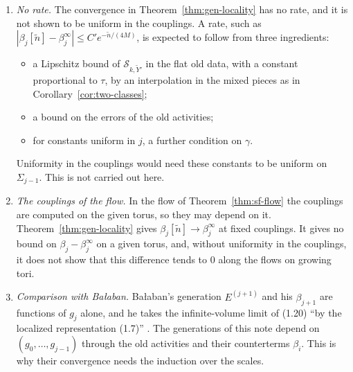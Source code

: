 \begin{remark}\label{rem:gl-rate}
\begin{enumerate}[label=(\alph*)]
\item \emph{No rate.} The convergence in Theorem~\ref{thm:gen-locality} has no rate, and it is not shown to be uniform in the couplings. A rate, such as $|\beta_j[\tilde n]-\beta^\infty_j|\le C'e^{-\tilde n/(4M)}$, is expected to follow from three ingredients:
  \begin{itemize}
  \item a Lipschitz bound of $\mathscr S_{k,\tilde Y'}$ in the flat old data, with a constant proportional to $\tau$, by an interpolation in the mixed pieces as in Corollary~\ref{cor:two-classes};
  \item a bound on the errors of the old activities;
  \item for constants uniform in $j$, a further condition on $\gamma$.
  \end{itemize}
  Uniformity in the couplings would need these constants to be uniform on $\Sigma_{j-1}$. This is not carried out here.
\item \emph{The couplings of the flow.} In the flow of Theorem~\ref{thm:sf-flow} the couplings are computed on the given torus, so they may depend on it. Theorem~\ref{thm:gen-locality} gives $\beta_j[\tilde n]\to\beta^\infty_j$ at fixed couplings. It gives no bound on $\beta_j-\beta^\infty_j$ on a given torus, and, without uniformity in the couplings, it does not show that this difference tends to $0$ along the flows on growing tori.
\item \emph{Comparison with Ba\l aban.} Ba\l aban's generation $E^{(j+1)}$ and his $\beta_{j+1}$ are functions of $g_j$ alone, and he takes the infinite-volume limit of (1.20) ``by the localized representation (1.7)'' \cite[(1.18), (1.20)--(1.22)]{BalYM4I}. The generations of this note depend on $(g_0,\dots,g_{j-1})$ through the old activities and their counterterms $\beta_i$. This is why their convergence needs the induction over the scales.
\end{enumerate}
\end{remark}
